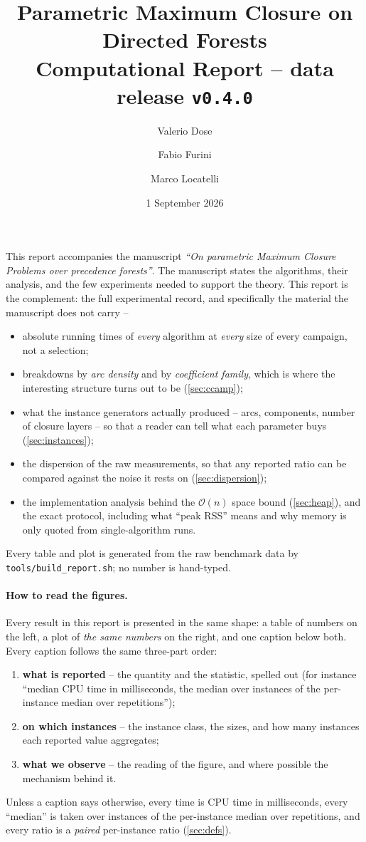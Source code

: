 \documentclass[11pt]{article}
\title{\vspace{-1.4cm}Parametric Maximum Closure on Directed Forests\\
\large Computational Report -- data release \texttt{v0.4.0}}
\author{Valerio Dose \and Fabio Furini \and Marco Locatelli}
\date{1 September 2026}
\begin{document}
\maketitle

\noindent
This report accompanies the manuscript \emph{``On parametric Maximum Closure
Problems over precedence forests''}. The manuscript states the algorithms,
their analysis, and the few experiments needed to support the theory. This
report is the complement: the full experimental record, and specifically the
material the manuscript does not carry --
\begin{itemize}
  \item absolute running times of \emph{every} algorithm at \emph{every} size
  of every campaign, not a selection;
  \item breakdowns by \emph{arc density} and by \emph{coefficient family},
  which is where the interesting structure turns out to be
  (\cref{sec:ccamp});
  \item what the instance generators actually produced -- arcs, components,
  number of closure layers -- so that a reader can tell what each parameter
  buys (\cref{sec:instances});
  \item the dispersion of the raw measurements, so that any reported ratio can
  be compared against the noise it rests on (\cref{sec:dispersion});
  \item the implementation analysis behind the $\mathcal O(n)$ space bound
  (\cref{sec:heap}), and the exact protocol, including what ``peak RSS'' means
  and why memory is only quoted from single-algorithm runs.
\end{itemize}
Every table and plot is generated from the raw benchmark data by
\texttt{tools/build\_report.sh}; no number is hand-typed.

\paragraph{How to read the figures.} Every result in this report is presented
in the same shape: a table of numbers on the left, a plot of \emph{the same
numbers} on the right, and one caption below both. Every caption follows the
same three-part order:
\begin{enumerate}
  \item \textbf{what is reported} -- the quantity and the statistic, spelled
  out (for instance ``median CPU time in milliseconds, the median over
  instances of the per-instance median over repetitions'');
  \item \textbf{on which instances} -- the instance class, the sizes, and how
  many instances each reported value aggregates;
  \item \textbf{what we observe} -- the reading of the figure, and where
  possible the mechanism behind it.
\end{enumerate}
Unless a caption says otherwise, every time is CPU time in milliseconds, every
``median'' is taken over instances of the per-instance median over repetitions,
and every ratio is a \emph{paired} per-instance ratio (\cref{sec:defs}).
\end{document}
